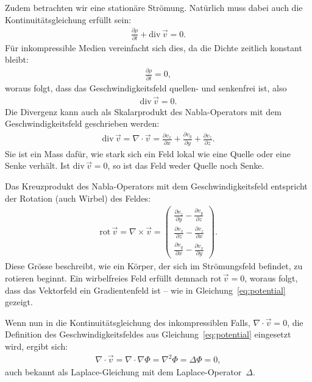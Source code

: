 Zudem betrachten wir eine stationäre Strömung.  
Natürlich muss dabei auch die Kontinuitätsgleichung
erfüllt sein:
\begin{align*}
    \frac{\partial \rho}{\partial t}
    + 
    \mathrm{div}\,\vec{v} 
    = 
    0.
\end{align*}
Für inkompressible Medien vereinfacht sich dies, 
da die Dichte zeitlich konstant bleibt:
\begin{align*}
    \frac{\partial \rho}{\partial t} 
    = 
    0,
\end{align*}
woraus folgt, dass das Geschwindigkeitsfeld 
quellen- und senkenfrei ist, also
\begin{align*}
    \mathrm{div}\,\vec{v} = 0.
\end{align*}
Die Divergenz kann auch als Skalarprodukt 
des Nabla-Operators mit dem Geschwindigkeitsfeld 
geschrieben werden:
\begin{align*}
    \mathrm{div}\,\vec{v}
    = 
    \nabla \cdot \vec{v}
    = 
    \frac{\partial v_x}{\partial x} 
    +
    \frac{\partial v_y}{\partial y} 
    +
    \frac{\partial v_z}{\partial z}.
\end{align*}
Sie ist ein Mass dafür, wie stark sich ein Feld lokal 
wie eine Quelle oder eine Senke verhält.  
Ist $\mathrm{div}\,\vec{v} = 0$, 
so ist das Feld weder Quelle noch Senke.

Das Kreuzprodukt des Nabla-Operators mit 
dem Geschwindigkeitsfeld entspricht der Rotation 
(auch Wirbel) des Feldes:
\begin{align*}
    \mathrm{rot}\,\vec{v} 
    = 
    \nabla \times \vec{v}
    =
    \begin{pmatrix}
        \frac{\partial v_z}{\partial y} - \frac{\partial v_y}{\partial z} \\
        \frac{\partial v_x}{\partial z} - \frac{\partial v_z}{\partial x} \\
        \frac{\partial v_y}{\partial x} - \frac{\partial v_x}{\partial y}
    \end{pmatrix}.
\end{align*}
Diese Grösse beschreibt, wie ein Körper, 
der sich im Strömungsfeld befindet, zu rotieren beginnt.  
Ein wirbelfreies Feld erfüllt demnach
 $\mathrm{rot}\,\vec{v} = 0$,  
woraus folgt, dass das Vektorfeld ein Gradientenfeld 
ist – wie in Gleichung~\eqref{eq:potential} gezeigt.

Wenn nun in die Kontinuitätsgleichung des inkompressiblen 
Falls, $\nabla \cdot \vec{v} = 0$, 
die Definition des Geschwindigkeitsfeldes 
aus Gleichung~\eqref{eq:potential} eingesetzt wird, 
ergibt sich:
\begin{align}
    \nabla \cdot \vec{v}
    = 
    \nabla \cdot \nabla \Phi
    = 
    \nabla^2 \Phi
    = 
    \Delta \Phi
    = 
    0, \label{eq:laplace}
\end{align}
auch bekannt als Laplace-Gleichung mit dem 
Laplace-Operator~$\Delta$.



